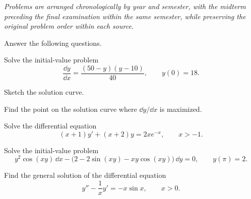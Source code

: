 \ifCourseSolutions\else
{\noindent\small\itshape Problems are arranged chronologically by year and semester, with the midterm preceding the final examination within the same semester, while preserving the original problem order within each source.\par}
\vspace{0.22cm}
\fi

\begin{problem}
Answer the following questions.
\begin{problemsubparts}
\item Solve the initial-value problem
\[
\frac{\dd y}{\dd x}=\frac{(50-y)(y-10)}{40},
\qquad
y(0)=18.
\]
\item Sketch the solution curve.
\item Find the point on the solution curve where $\dd y/\dd x$ is maximized.
\end{problemsubparts}
\end{problem}

\begin{problem}
Solve the differential equation
\[
(x+1)y'+(x+2)y=2xe^{-x},
\qquad x>-1.
\]
\end{problem}

\begin{problem}
Solve the initial-value problem
\[
y^2\cos(xy)\,\dd x
-\bigl(2-2\sin(xy)-xy\cos(xy)\bigr)\,\dd y=0,
\qquad
y(\pi)=2.
\]
\end{problem}

\begin{problem}
Find the general solution of the differential equation
\[
y''-\frac{1}{x}y'=-x\sin x,
\qquad x>0.
\]
\end{problem}


